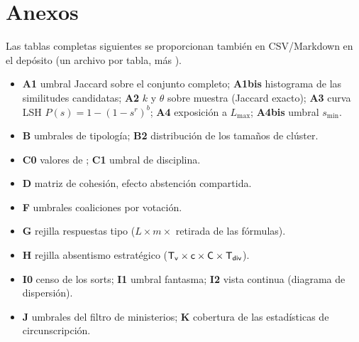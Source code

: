 \section{Anexos}\label{sec:annexes-es}
Las tablas completas siguientes se proporcionan también en CSV/Markdown en el
depósito (un archivo por tabla, más ).
\begin{itemize}\small
  \item \textbf{A1} umbral Jaccard sobre el conjunto completo; \textbf{A1bis}
        histograma de las similitudes candidatas; \textbf{A2} $k$ y $\theta$ sobre
        muestra (Jaccard exacto); \textbf{A3} curva LSH $P(s)=1-(1-s^r)^b$;
        \textbf{A4} exposición a $L_{\max}$; \textbf{A4bis} umbral $s_{\min}$.
  \item \textbf{B} umbrales de tipología; \textbf{B2} distribución de los tamaños de
        clúster.
  \item \textbf{C0} valores de ; \textbf{C1} umbral de
        disciplina.
  \item \textbf{D} matriz de cohesión, efecto \og{}abstención compartida\fg{}.
  \item \textbf{F} umbrales \og{}coaliciones por votación\fg{}.
  \item \textbf{G} rejilla \og{}respuestas tipo\fg{} ($L\times m\times$ retirada de
        las fórmulas).
  \item \textbf{H} rejilla \og{}absentismo estratégico\fg{} ($\mathsf{T_v}\times\mathsf{c}\times\mathsf{C}\times\mathsf{T_{div}}$).
  \item \textbf{I0} censo de los sorts; \textbf{I1} umbral fantasma; \textbf{I2}
        vista continua (diagrama de dispersión).
  \item \textbf{J} umbrales del filtro de ministerios; \textbf{K} cobertura de las
        estadísticas de circunscripción.
\end{itemize}

